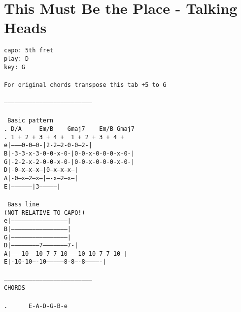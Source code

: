 \newpage
\section{This Must Be the Place - Talking Heads}
\label{This Must Be the Place - Talking Heads}
\label{This Must Be the Place - Talking Heads}
\texttt{capo:\ 5th\ fret\\
play:\ D\\
key:\ G\\
\\
For\ original\ chords\ transpose\ this\ tab\ +5\ to\ G\\
\\
---------------------------------------------------------------------------\\
\\
\lbrack\ Basic\ pattern\rbrack\\
. D/A\ \ \ \ \ Em/B\ \ \ \ Gmaj7\ \ \ \ Em/B\ Gmaj7\\
. 1\ +\ 2\ +\ 3\ +\ 4\ +\ \ 1\ +\ 2\ +\ 3\ +\ 4\ +\\
e|---------0-0---0-|2-2---2-0-0---2-|\\
B|-3-3-x-3-0-0-x-0-|0-0-x-0-0-0-x-0-|\\
G|-2-2-x-2-0-0-x-0-|0-0-x-0-0-0-x-0-|\\
D|-0---x---x---x---|0---x---x---x---|\\
A|-0---x---2---x---|----x---2---x---|\\
E|-----------------|3---------------|\\
\\
\lbrack\ Bass line \rbrack\\
(NOT RELATIVE TO CAPO!)\\
e|-----------------------------------------------|\\
B|-----------------------------------------------|\\
G|-----------------------------------------------|\\
D|-----------------------7---------------------7-|\\
A|-------10----10-7-7-10--------10---10-7-7-10---|\\
E|-10-10----10--------------8-8----8-------------|\\
\\
---------------------------------------------------------------------------\\
CHORDS\\
\\
. \ \ \ \ \ E-A-D-G-B-e\\
}
